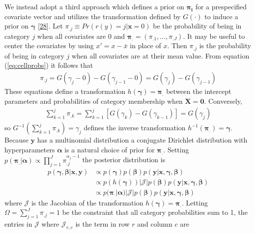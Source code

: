 \documentclass[
]{article}
\begin{document}
We instead adopt a third approach which defines a prior on \(\boldsymbol{\pi_i}\) for a prespecified covariate vector and utilizes the transformation defined by \(G(\cdot)\) to induce a prior on \(\boldsymbol{\gamma}\) {{[}\protect\hyperlink{ref-betancourt_ordinal_2019}{28}{]}}.
Let \(\pi_{.j} \equiv Pr(r(y)=j|\boldsymbol{x}=0)\) be the probability of being in category \(j\) when all covariates are 0 and \(\boldsymbol{\pi_{.}}=(\pi_{.1},\ldots,\pi_{.J})\).
It may be useful to center the covariates by using \(x'=x-\bar{x}\) in place of \(x\). Then \(\pi_{.j}\) is the probability of being in category \(j\) when all covariates are at their mean value. From equation (\ref{eq:cellprobs}) it follows that
\begin{gather}
\pi_{.j}=G(\gamma_j-0)-G(\gamma_{j-1}-0)=G(\gamma_j)-G(\gamma_{j-1})
\end{gather}
These equations define a transformation \(h(\boldsymbol{\gamma})=\boldsymbol{\pi_{.}}\) between the intercept parameters and probabilities of category membership when \(\boldsymbol{X}=\boldsymbol{0}\). Conversely,
\begin{gather}
\label{eq:invtrans}
\sum_{k=1}^{j}\pi_{.k}=\sum_{k=1}^{j}\left[G(\gamma_k)-G(\gamma_{k-1})\right]=G(\gamma_j)
\end{gather}
so \(G^{-1}\left(\sum_{k=1}^{j}\pi_{.k}\right)=\gamma_j\) defines the inverse transformation \(h^{-1}(\boldsymbol{\pi_{.}})=\boldsymbol{\gamma}\). Because \(\boldsymbol{y}\) has a multinomial distribution a conjugate Dirichlet distribution with hyperparameters \(\boldsymbol{\alpha}\) is a natural choice of prior for \(\boldsymbol{\pi_{.}}\). Setting \(p(\boldsymbol{\pi_{.}}|\boldsymbol{\alpha}) \propto \prod_{j=1}^{J}\pi_{.j}^{\alpha_j-1}\) the posterior distribution is
\begin{align}
p(\boldsymbol{\gamma},\boldsymbol{\beta}|\boldsymbol{x},\boldsymbol{y}) & \propto p(\boldsymbol{\gamma})p(\boldsymbol{\beta}) p(\boldsymbol{y}|\boldsymbol{x},\boldsymbol{\gamma},\boldsymbol{\beta})\\
&\propto p(h(\boldsymbol{\gamma}))|\mathcal{J}|p(\boldsymbol{\beta}) p(\boldsymbol{y}|\boldsymbol{x},\boldsymbol{\gamma},\boldsymbol{\beta})\\
\label{eq:post}
&\propto p(\boldsymbol{\pi_{\cdot}}|\boldsymbol{\alpha})|\mathcal{J}|p(\boldsymbol{\beta}) p(\boldsymbol{y}|\boldsymbol{x},\boldsymbol{\gamma},\boldsymbol{\beta})
\end{align}
where \(\mathcal{J}\) is the Jacobian of the transformation \(h(\boldsymbol{\gamma})=\boldsymbol{\pi_{.}}\). Letting \(\Omega=\sum_{j=1}^J\pi_{.j}=1\) be the constraint that all category probabilities sum to 1, the entries in \(\mathcal{J}\) where \(\mathcal{J}_{r,c}\) is the term in row \(r\) and column \(c\) are
\end{document}
